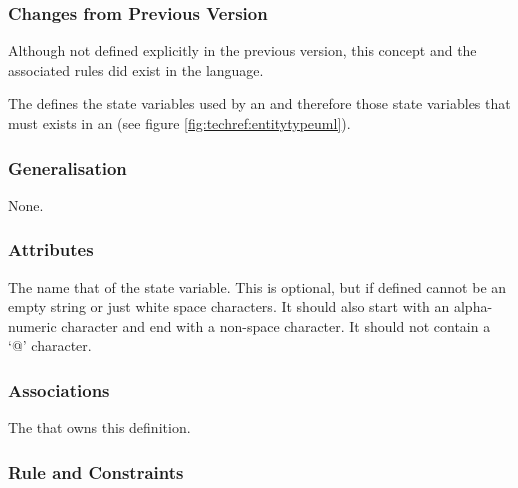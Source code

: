 \subsubsection{Changes from Previous Version}

Although not defined explicitly in the previous version, this concept
and the associated rules did exist in the language.

\label{defn:StateVariableDefinition}

The  defines the state variables
used by an  and therefore those state variables
that must exists in an  (see figure
\ref{fig:techref:entitytypeuml}).

\subsubsection{Generalisation}

None.

\subsubsection{Attributes}

\begin{attributes}
   The name that of the state variable. This
  is optional, but if defined cannot be an empty string or just white
  space characters. It should also start with an alpha-numeric
  character and  end with a non-space character. It should not contain
  a `@' character.
\end{attributes}


\subsubsection{Associations}

\begin{attributes}
   The
   that owns this definition.
\end{attributes}

\subsubsection{Rule and Constraints}

